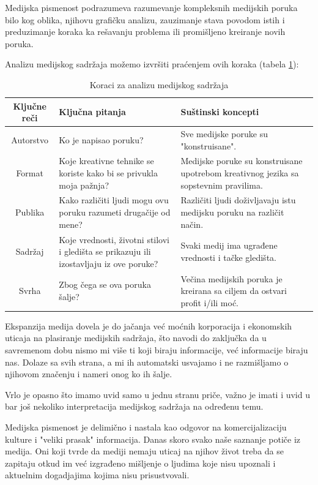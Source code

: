 \documentclass[a4paper]{article}
\begin{document}
Medijska pismenost podrazumeva razumevanje kompleksnih medijskih poruka bilo kog oblika, njihovu grafičku analizu, zauzimanje stava povodom istih i preduzimanje koraka ka rešavanju problema ili promišljeno kreiranje novih poruka.

Analizu medijskog sadržaja možemo izvršiti praćenjem ovih koraka \cite{tab2} (tabela \ref{tab:tabela2}):

\begin{table}[ht!]
\begin{center}
\begin{tabular}{|c|p{4cm}|p{3cm} |} \hline
Ključne reči& Ključna pitanja& Suštinski koncepti\\ \hline
Autorstvo&Ko je napisao poruku?&Sve medijske poruke su "konstruisane".\\ \hline
Format &Koje kreativne tehnike se koriste kako bi se privukla moja pažnja?&Medijske poruke su konstruisane upotrebom kreativnog jezika sa sopstevnim pravilima.\\ \hline
Publika &Kako različiti ljudi mogu ovu poruku razumeti drugačije od mene?&Različiti ljudi doživljavaju istu medijsku poruku na različit način.\\ \hline
Sadržaj &Koje vrednosti, životni stilovi i gledišta se prikazuju ili izostavljaju iz ove poruke?&Svaki medij ima ugrađene vrednosti i tačke gledišta.\\ \hline
Svrha &Zbog čega se ova poruka šalje?&Večina medijskih poruka je kreirana sa ciljem da ostvari profit i/ili moć.\\ \hline
\end{tabular}
\caption{Koraci za analizu medijskog sadržaja}
\label{tab:tabela2}
\end{center}
\end{table}

Ekspanzija medija dovela je do jačanja već moćnih korporacija i ekonomskih uticaja na plasiranje medijskih sadržaja, što navodi do zaključka da u savremenom dobu nismo mi više ti koji biraju informacije, već informacije biraju nas. Dolaze sa svih strana, a mi ih automatski usvajamo i ne razmišljamo o njihovom značenju i nameri onog ko ih šalje.

Vrlo je opasno što imamo uvid samo u jednu stranu priče, važno je imati i uvid u bar još nekoliko interpretacija medijskog sadržaja na određenu temu.

Medijska pismenost je delimično i nastala kao odgovor na komercijalizaciju kulture i "veliki prasak" informacija. Danas skoro svako naše saznanje potiče iz medija. Oni koji tvrde da mediji nemaju uticaj na njihov život treba da se zapitaju otkud im već izgrađeno mišljenje o ljudima koje nisu upoznali i aktuelnim dogadjajima kojima nisu prisustvovali.
\end{document}
